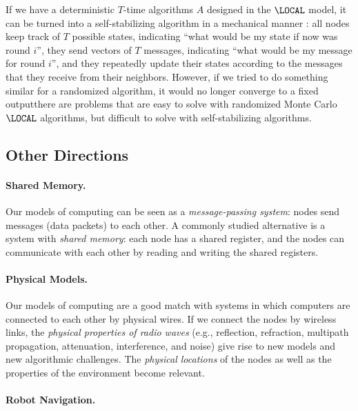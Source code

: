 If we have a deterministic $T$-time algorithms $A$ designed in the $\LOCAL$ model, it can be turned into a self-stabilizing algorithm in a mechanical manner \cite{lenzen09local-self-stab}: all nodes keep track of $T$ possible states, indicating ``what would be my state if now was round $i$'', they send vectors of $T$ messages, indicating ``what would be my message for round $i$'', and they repeatedly update their states according to the messages that they receive from their neighbors. However, if we tried to do something similar for a randomized algorithm, it would no longer converge to a fixed output\mydash{}there are problems that are easy to solve with randomized Monte Carlo $\LOCAL$ algorithms, but difficult to solve with self-stabilizing algorithms.



\subsection{Other Directions}

\paragraph{Shared Memory.}

Our models of computing can be seen as a \emph{message-passing system}: nodes send messages (data packets) to each other. A commonly studied alternative is a system with \emph{shared memory}: each node has a shared register, and the nodes can communicate with each other by reading and writing the shared registers.


\paragraph{Physical Models.}

Our models of computing are a good match with systems in which computers are connected to each other by physical wires. If we connect the nodes by wireless links, the \emph{physical properties of radio waves} (e.g., reflection, refraction, multipath propagation, attenuation, interference, and noise) give rise to new models and new algorithmic challenges. The \emph{physical locations} of the nodes as well as the properties of the environment become relevant.


\paragraph{Robot Navigation.}

